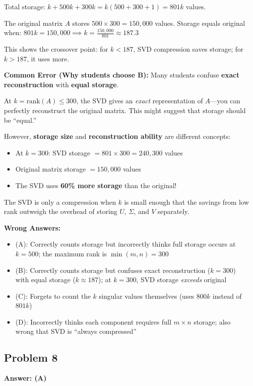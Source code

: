 \documentclass[12pt]{amsart}
\newcommand{\correct}[1]{{\color{correctgreen}\textbf{#1}}}
\begin{document}
\begin{itemize}
Total storage: $k + 500k + 300k = k(500 + 300 + 1) = 801k$ values.

The original matrix $A$ stores $500 \times 300 = 150{,}000$ values. Storage equals original when:
$801k = 150{,}000 \implies k = \frac{150{,}000}{801} \approx 187.3$

This shows the crossover point: for $k < 187$, SVD compression saves storage; for $k > 187$, it uses more.

\textbf{Common Error (Why students choose B):} Many students confuse \textbf{exact reconstruction} with \textbf{equal storage}. 

At $k = \text{rank}(A) \leq 300$, the SVD gives an \textit{exact} representation of $A$---you can perfectly reconstruct the original matrix. This might suggest that storage should be ``equal.''

However, \textbf{storage size} and \textbf{reconstruction ability} are different concepts:
\begin{itemize}
\item At $k = 300$: SVD storage $= 801 \times 300 = 240{,}300$ values
\item Original matrix storage $= 150{,}000$ values
\item The SVD uses \textbf{60\% more storage} than the original!
\end{itemize}

The SVD is only a compression when $k$ is small enough that the savings from low rank outweigh the overhead of storing $U$, $\Sigma$, and $V$ separately.

\textbf{Wrong Answers:}
\begin{itemize}
\item (A): Correctly counts storage but incorrectly thinks full storage occurs at $k = 500$; the maximum rank is $\min(m,n) = 300$
\item (B): Correctly counts storage but confuses exact reconstruction ($k = 300$) with equal storage ($k \approx 187$); at $k = 300$, SVD storage \textit{exceeds} original
\item (C): Forgets to count the $k$ singular values themselves (uses $800k$ instead of $801k$)
\item (D): Incorrectly thinks each component requires full $m \times n$ storage; also wrong that SVD is ``always compressed''
\end{itemize}

\subsection*{Problem 8}
\correct{Answer: (A)}


\end{itemize}
\end{document}
